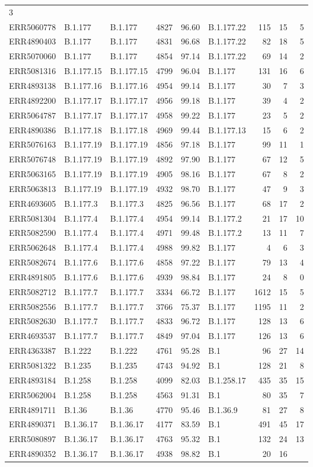 \documentclass[
]{article}
\begin{document}
\begin{longtable}[]{@{}lllrrlrrr@{}}
3\tabularnewline
ERR5060778 & B.1.177 & B.1.177 & 4827 & 96.60 & B.1.177.22 & 115 & 15 &
5\tabularnewline
ERR4890403 & B.1.177 & B.1.177 & 4831 & 96.68 & B.1.177.22 & 82 & 18 &
5\tabularnewline
ERR5070060 & B.1.177 & B.1.177 & 4854 & 97.14 & B.1.177.22 & 69 & 14 &
2\tabularnewline
ERR5081316 & B.1.177.15 & B.1.177.15 & 4799 & 96.04 & B.1.177 & 131 & 16
& 6\tabularnewline
ERR4893138 & B.1.177.16 & B.1.177.16 & 4954 & 99.14 & B.1.177 & 30 & 7 &
3\tabularnewline
ERR4892200 & B.1.177.17 & B.1.177.17 & 4956 & 99.18 & B.1.177 & 39 & 4 &
2\tabularnewline
ERR5064787 & B.1.177.17 & B.1.177.17 & 4958 & 99.22 & B.1.177 & 23 & 5 &
2\tabularnewline
ERR4890386 & B.1.177.18 & B.1.177.18 & 4969 & 99.44 & B.1.177.13 & 15 &
6 & 2\tabularnewline
ERR5076163 & B.1.177.19 & B.1.177.19 & 4856 & 97.18 & B.1.177 & 99 & 11
& 1\tabularnewline
ERR5076748 & B.1.177.19 & B.1.177.19 & 4892 & 97.90 & B.1.177 & 67 & 12
& 5\tabularnewline
ERR5063165 & B.1.177.19 & B.1.177.19 & 4905 & 98.16 & B.1.177 & 67 & 8 &
2\tabularnewline
ERR5063813 & B.1.177.19 & B.1.177.19 & 4932 & 98.70 & B.1.177 & 47 & 9 &
3\tabularnewline
ERR4693605 & B.1.177.3 & B.1.177.3 & 4825 & 96.56 & B.1.177 & 68 & 17 &
2\tabularnewline
ERR5081304 & B.1.177.4 & B.1.177.4 & 4954 & 99.14 & B.1.177.2 & 21 & 17
& 10\tabularnewline
ERR5082590 & B.1.177.4 & B.1.177.4 & 4971 & 99.48 & B.1.177.2 & 13 & 11
& 7\tabularnewline
ERR5062648 & B.1.177.4 & B.1.177.4 & 4988 & 99.82 & B.1.177 & 4 & 6 &
3\tabularnewline
ERR5082674 & B.1.177.6 & B.1.177.6 & 4858 & 97.22 & B.1.177 & 79 & 13 &
4\tabularnewline
ERR4891805 & B.1.177.6 & B.1.177.6 & 4939 & 98.84 & B.1.177 & 24 & 8 &
0\tabularnewline
ERR5082712 & B.1.177.7 & B.1.177.7 & 3334 & 66.72 & B.1.177 & 1612 & 15
& 5\tabularnewline
ERR5082556 & B.1.177.7 & B.1.177.7 & 3766 & 75.37 & B.1.177 & 1195 & 11
& 2\tabularnewline
ERR5082630 & B.1.177.7 & B.1.177.7 & 4833 & 96.72 & B.1.177 & 128 & 13 &
6\tabularnewline
ERR4693537 & B.1.177.7 & B.1.177.7 & 4849 & 97.04 & B.1.177 & 126 & 13 &
6\tabularnewline
ERR4363387 & B.1.222 & B.1.222 & 4761 & 95.28 & B.1 & 96 & 27 &
14\tabularnewline
ERR5081322 & B.1.235 & B.1.235 & 4743 & 94.92 & B.1 & 128 & 21 &
8\tabularnewline
ERR4893184 & B.1.258 & B.1.258 & 4099 & 82.03 & B.1.258.17 & 435 & 35 &
15\tabularnewline
ERR5062004 & B.1.258 & B.1.258 & 4563 & 91.31 & B.1 & 80 & 35 &
7\tabularnewline
ERR4891711 & B.1.36 & B.1.36 & 4770 & 95.46 & B.1.36.9 & 81 & 27 &
8\tabularnewline
ERR4890371 & B.1.36.17 & B.1.36.17 & 4177 & 83.59 & B.1 & 491 & 45 &
17\tabularnewline
ERR5080897 & B.1.36.17 & B.1.36.17 & 4763 & 95.32 & B.1 & 132 & 24 &
13\tabularnewline
ERR4890352 & B.1.36.17 & B.1.36.17 & 4938 & 98.82 & B.1 & 20 & 16 &

\end{longtable}
\end{document}
